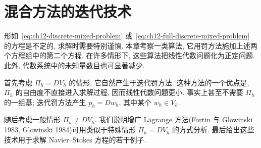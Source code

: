 \section{混合方法的迭代技术}
\label{chap:ch13-iterative-techniques-mixed-methods}
\providecommand{\chvec}[1]{\underset{\sim}{#1}}
\providecommand{\chten}[1]{\underset{\approx}{#1}}

形如~\eqref{eq:ch12-discrete-mixed-problem} 或~\eqref{eq:ch12-full-discrete-mixed-problem} 的方程是不定的, 求解时需要特别谨慎. 本章考察一类算法, 它用罚方法施加上述两个方程组中的第二个方程. 在许多情形下, 这些算法把线性代数问题化为正定问题. 此外, 代数系统中的未知量数目也可显著减少.

首先考虑 $\Pi_h=DV_h$ 的情形, 它自然产生于迭代罚方法. 这种方法的一个优点是, $\Pi_h$ 的自由度不直接进入求解过程, 因而线性代数问题更小. 事实上甚至不需要 $\Pi_h$ 的一组基; 迭代罚方法产生 $p_h=Dw_h$, 其中某个 $w_h\in V_h$.

随后考虑一般情形 $\Pi_h\neq DV_h$. 我们说明增广 Lagrange 方法(Fortin 与 Glowinski 1983, Glowinski 1984)可用类似于特殊情形 $\Pi_h=DV_h$ 的方式分析. 最后给出这些技术用于求解 Navier--Stokes 方程的若干例子.







